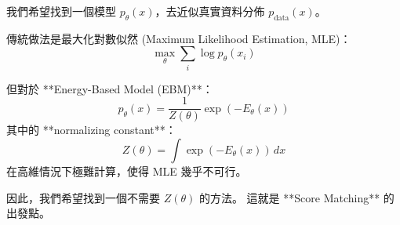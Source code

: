 我們希望找到一個模型 \( p_\theta(x) \)，去近似真實資料分佈 \( p_{\text{data}}(x) \)。

傳統做法是最大化對數似然 (Maximum Likelihood Estimation, MLE)：
\[
\max_\theta \sum_i \log p_\theta(x_i)
\]

但對於 **Energy-Based Model (EBM)**：
\[
p_\theta(x) = \frac{1}{Z(\theta)} \exp(-E_\theta(x))
\]
其中的 **normalizing constant**：
\[
Z(\theta) = \int \exp(-E_\theta(x))\,dx
\]
在高維情況下極難計算，使得 MLE 幾乎不可行。

因此，我們希望找到一個不需要 \(Z(\theta)\) 的方法。  
這就是 **Score Matching** 的出發點。
